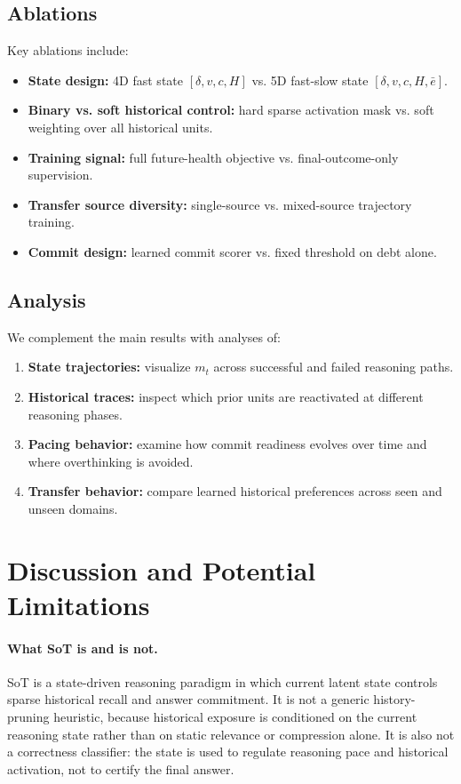 \documentclass{article}
\begin{document}
\subsection{Ablations}
Key ablations include:
\begin{itemize}[leftmargin=1.3em, itemsep=0.2em]
    \item \textbf{State design:} 4D fast state $[\delta,v,c,H]$ vs. 5D fast-slow state $[\delta,v,c,H,\bar e]$.
    \item \textbf{Binary vs. soft historical control:} hard sparse activation mask vs. soft weighting over all historical units.
    \item \textbf{Training signal:} full future-health objective vs. final-outcome-only supervision.
    \item \textbf{Transfer source diversity:} single-source vs. mixed-source trajectory training.
    \item \textbf{Commit design:} learned commit scorer vs. fixed threshold on debt alone.
\end{itemize}

\subsection{Analysis}
We complement the main results with analyses of:
\begin{enumerate}[leftmargin=1.3em, itemsep=0.2em]
    \item \textbf{State trajectories:} visualize $m_t$ across successful and failed reasoning paths.
    \item \textbf{Historical traces:} inspect which prior units are reactivated at different reasoning phases.
    \item \textbf{Pacing behavior:} examine how commit readiness evolves over time and where overthinking is avoided.
    \item \textbf{Transfer behavior:} compare learned historical preferences across seen and unseen domains.
\end{enumerate}

\section{Discussion and Potential Limitations}
\label{sec:discussion}

\paragraph{What SoT is and is not.}
SoT is a state-driven reasoning paradigm in which current latent state controls sparse historical recall and answer commitment. It is not a generic history-pruning heuristic, because historical exposure is conditioned on the current reasoning state rather than on static relevance or compression alone. It is also not a correctness classifier: the state is used to regulate reasoning pace and historical activation, not to certify the final answer.
\end{document}

